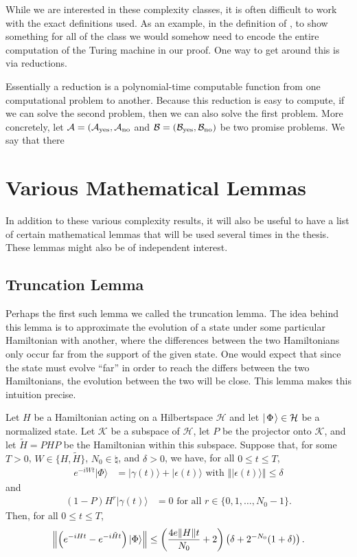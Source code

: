 \documentclass[../thesis-main/thesis-main]{subfiles}
\begin{document}
While we are interested in these complexity classes, it is often difficult to work with the exact definitions used.  As an example, in the definition of \NP, to show something for all of the class we would somehow need to encode the entire computation of the Turing machine in our proof.  One way to get around this is via reductions.

Essentially a reduction is a polynomial-time computable function from one computational problem to another.  Because this reduction is easy to compute, if we can solve the second problem, then we can also solve the first problem.  More concretely, let $\mathcal{A} = (\mathcal{A}_{\text{yes}},\mathcal{A}_{\text{no}}$ and $\mathcal{B}=(\mathcal{B}_{\text{yes}},\mathcal{B}_{\text{no}})$ be two promise problems.  We say that there 


\section{Various Mathematical Lemmas}

In addition to these various complexity results, it will also be useful to have a list of certain mathematical lemmas that will be used several times in the thesis.  These lemmas might also be of independent interest.
\subsection{Truncation Lemma}

Perhaps the first such lemma we called the truncation lemma.  The idea behind this lemma is to approximate the evolution of a state under some particular Hamiltonian with another, where the differences between the two Hamiltonians only occur far from the support of the given state.  One would expect that since the state must evolve ``far'' in order to reach the differs between the two Hamiltonians, the evolution between the two will be close.  This lemma makes this intuition precise.

\begin{lemma}
\label{lem:truncation}
Let $H$ be a Hamiltonian acting on a Hilbertspace $\mathcal{H}$ and let $|\mspace{2mu} \Phi \mspace{2mu} \rangle\in\mathcal{H}$ be a normalized state. Let
$\mathcal{K}$ be a subspace of $\mathcal{H}$, let $P$ be the projector onto $\mathcal{K}$,
and let $\tilde{H}=PHP$ be the Hamiltonian within this subspace. Suppose
that, for some $T>0$, $W\in\{H,\tilde{H}\}$, $N_0\in\natural$,
and $\delta>0$, we have, for all $0\leq t\leq T$, 
\begin{align*}
e^{-iWt}|\Phi\rangle & = |\gamma(t)\rangle+|\epsilon(t)\rangle \text{ with }
\left\Vert |\epsilon(t)\rangle\right\Vert \leq \delta
\end{align*}
and
\begin{align*}
  (1-P) H^{r}|\gamma(t)\rangle & = 0 \text{ for all } r\in\{0,1,\ldots, N_0-1\}.
\end{align*}
Then, for all $0\leq t \leq T$, 
\[
  \left\|{\left(e^{-iHt}-e^{-i\tilde{H}t}\right)|\Phi\rangle}\right\|
  \leq \left(\frac{4e\|{H}\|t}{N_0} + 2 \right) 
        \left(\delta + 2^{-N_0}(1+\delta)\right).
\]
\end{lemma}
\end{document}
